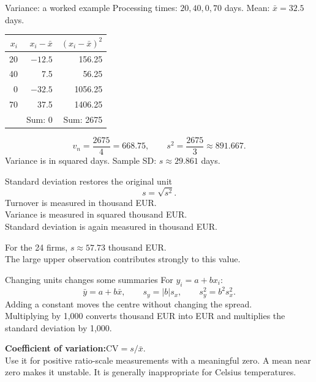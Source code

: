 \begin{frame}{Variance: a worked example}
\small
Processing times: $20,40,0,70$ days. Mean: $\bar x=32.5$ days.
\begin{center}\begin{tabular}{rrr}\toprule
$x_i$ & $x_i-\bar x$ & $(x_i-\bar x)^2$\\\midrule
20 & $-12.5$ & 156.25\\
40 & 7.5 & 56.25\\
0 & $-32.5$ & 1056.25\\
70 & 37.5 & 1406.25\\\midrule
 & Sum: 0 & Sum: 2675\\\bottomrule
\end{tabular}\end{center}
\[v_n=\frac{2675}{4}=668.75,\qquad s^2=\frac{2675}{3}\approx891.667.\]
Variance is in squared days. Sample SD: $s\approx29.861$ days.
\end{frame}

\begin{frame}{Standard deviation restores the original unit}
\[s=\sqrt{s^2}.\]
Turnover is measured in thousand EUR.\\
Variance is measured in squared thousand EUR.\\
Standard deviation is again measured in thousand EUR.
\par\vspace{3mm}
For the 24 firms, $s\approx57.73$ thousand EUR.\\
The large upper observation contributes strongly to this value.
\end{frame}

\begin{frame}{Changing units changes some summaries}
For $y_i=a+b x_i$:
\[\bar y=a+b\bar x,\qquad s_y=|b|s_x,\qquad s_y^2=b^2s_x^2.\]
Adding a constant moves the centre without changing the spread.\\
Multiplying by 1,000 converts thousand EUR into EUR and multiplies the standard deviation by 1,000.
\par\vspace{3mm}
\textbf{Coefficient of variation:}\quad $\mathrm{CV}=s/\bar{x}$.\\
Use it for positive ratio-scale measurements with a meaningful zero. A mean near zero makes it unstable. It is generally inappropriate for Celsius temperatures.
\end{frame}

